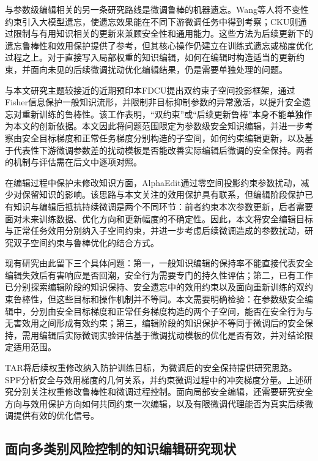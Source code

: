 与参数级编辑相关的另一条研究路线是微调鲁棒的机器遗忘。Wang等人将不变性约束引入大模型遗忘，使遗忘效果能在不同下游微调任务中得到考察\cite{wang2025ilu}；CKU则通过限制与有用知识相关的更新来兼顾安全性和通用能力\cite{shi2025cku}。这些方法为后续更新下的遗忘鲁棒性和效用保护提供了参考，但其核心操作仍建立在训练式遗忘或梯度优化过程之上。对于直接写入局部权重的知识编辑，如何在编辑时构造适当的更新约束，并面向未见的后续微调扰动优化编辑结果，仍是需要单独处理的问题。

与本文研究主题较接近的近期预印本FDCU提出双约束子空间投影框架，通过Fisher信息保护一般知识流形，并限制非目标抑制参数的异常激活，以提升安全遗忘对重新训练的鲁棒性\cite{li2026fdcu}。该工作表明，“双约束”或“后续更新鲁棒”本身不能单独作为本文的创新依据。本文因此将问题范围限定为参数级安全知识编辑，并进一步考察由安全目标梯度和正常任务梯度分别构造的子空间，如何约束编辑更新，以及基于代表性下游微调参数差的扰动模板是否能改善实际编辑后微调的安全保持。两者的机制与评估需在后文中逐项对照。

在编辑过程中保护未修改知识方面，AlphaEdit通过零空间投影约束参数扰动，减少对保留知识的影响\cite{fang2024alphaedit}。该思路与本文关注的效用保护具有联系，但编辑阶段保护已有知识与编辑后抵抗持续微调是两个不同环节：前者约束本次参数更新，后者需要面对未来训练数据、优化方向和更新幅度的不确定性。因此，本文将安全编辑目标与正常任务效用分别纳入子空间约束，并进一步考虑后续微调造成的参数扰动，研究双子空间约束与鲁棒优化的结合方式。

现有研究由此留下三个具体问题：第一，一般知识编辑的保持率不能直接代表安全编辑失效后有害响应是否回潮，安全行为需要专门的持久性评估；第二，已有工作已分别探索编辑阶段的知识保持、安全遗忘中的效用约束以及面向重新训练的双约束鲁棒性，但这些目标和操作机制并不等同。本文需要明确检验：在参数级安全编辑中，分别由安全目标梯度和正常任务梯度构造的两个子空间，能否在安全行为与无害效用之间形成有效约束；第三，编辑阶段的知识保护不等同于微调后的安全保持，需用编辑后实际微调实验评估基于微调扰动模板的优化是否有效，并对结论限定适用范围\cite{fang2024alphaedit,shi2025cku,wang2025ilu,li2026fdcu}。

TAR将后续权重修改纳入防护训练目标，为微调后的安全保持提供研究思路\cite{tamirisa2024tar}。SPF分析安全与效用梯度的几何关系，并约束微调过程中的冲突梯度分量\cite{zhang2026spf}。上述研究分别关注权重修改鲁棒性和微调过程控制。面向局部安全编辑，还需要研究安全方向与效用保护方向如何共同约束一次编辑，以及有限微调代理能否为真实后续微调提供有效的优化信号。

\subsection{面向多类别风险控制的知识编辑研究现状}


